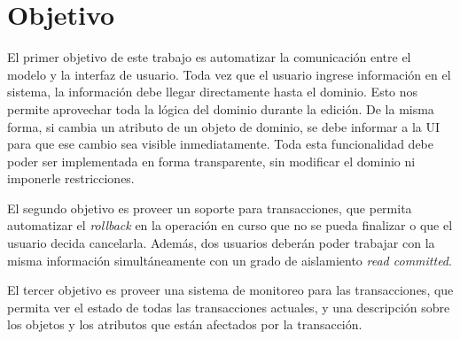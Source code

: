 \section{Objetivo}
\label{Objective}
El primer objetivo de este trabajo es automatizar la comunicación entre el
modelo y la interfaz de usuario.
Toda vez que el usuario ingrese información en el sistema, la
información debe llegar directamente hasta el dominio. Esto nos permite
aprovechar toda la lógica del dominio durante la edición.
De la misma forma, si cambia un atributo de un objeto de dominio, se debe
informar a la UI para que ese cambio sea visible
inmediatamente.
Toda esta funcionalidad debe poder ser implementada en forma transparente,
sin modificar el dominio ni imponerle restricciones.

El segundo objetivo es proveer un soporte para transacciones, que
permita automatizar el \emph{rollback} en la operación en curso que no se pueda
finalizar o que el usuario decida cancelarla.
Además, dos usuarios deberán poder trabajar con la misma información
simultáneamente con un grado de aislamiento \emph{read committed}.

El tercer objetivo es proveer una sistema de monitoreo para las transacciones,
que permita ver el estado de todas las transacciones actuales, y una descripción
sobre los objetos y los atributos que están afectados por la transacción.
